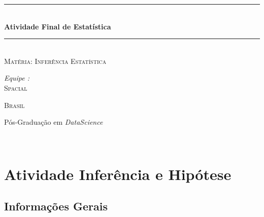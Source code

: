 \documentclass[a4paper,12pt]{article}
\newcommand{\HRule}{\rule{\linewidth}{0.5mm}}
\begin{document}
\begin{titlepage}
  \begin{sffamily}
  \begin{center}
  \vspace{5cm}

    \HRule \\[0.4cm]
    { \huge \bfseries Atividade Final de Estatística \\[0.4cm] }
    
    \HRule \\[2cm]

    \textsc{\LARGE Matéria: Inferência Estatística}\\[1cm]
    \begin{minipage}{0.4\textwidth}
      \begin{flushleft} \large
		\emph{Equipe :} \\        
        \textsc{Spacial}\\
      \end{flushleft}
    \end{minipage}
    \begin{minipage}{0.4\textwidth}
      \begin{flushright} \large
        \textsc{Brasil} 
      \end{flushright}
    \end{minipage}

    \vfill

    {\large Pós-Graduação em \textit{DataScience}}

  \end{center}
  \end{sffamily}
  \doclicenseThis
\end{titlepage}
\newpage

\renewcommand{\headrulewidth}{1pt}
\fancyfoot[C]{\thepage/\pageref{LastPage}}
{\ \vspace{-0.51cm}}

\tableofcontents

\section{Atividade Inferência e Hipótese}

\subsection{Informações Gerais}
\end{document}

